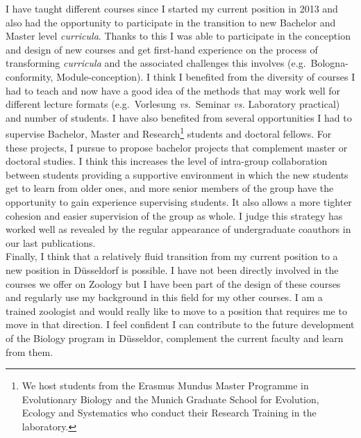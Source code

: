 \documentclass[a4paper,11pt]{article}
\begin{document}
I have taught different courses since I started my current position in 2013 and also had the opportunity to participate in the transition to new Bachelor and Master level \emph{curricula}. Thanks to this I was able to participate in the conception and design of new courses and get first-hand experience on the process of transforming \emph{curricula} and the associated challenges this involves (e.g.~Bologna-conformity, Module-conception). I think I benefited from the diversity of courses I had to teach and now have a good idea of the methods that may work well for different lecture formats (e.g.~Vorlesung \emph{vs.}~Seminar \emph{vs.} Laboratory practical) and number of students. I have also benefited from several opportunities I had to supervise Bachelor, Master and Research\footnote{We host students from the Erasmus Mundus Master Programme in Evolutionary Biology and the Munich Graduate School for Evolution, Ecology and Systematics who conduct their Research Training in the laboratory.} students and doctoral fellows. For these projects, I pursue to propose bachelor projects that complement master or doctoral studies. I think this increases the level of intra-group collaboration between students providing a supportive environment in which the new students get to learn from older ones, and more senior members of the group have the opportunity to gain experience supervising students. It also allows a more tighter cohesion and easier supervision of the group as whole. I judge this strategy has worked well as revealed by the regular appearance of undergraduate coauthors in our last publications.\\

Finally, I think that a relatively fluid transition from my current position to a new position in D\"usseldorf is possible. I have not been directly involved in the courses we offer on Zoology but I have been part of the design of these courses and regularly use my background in this field for my other courses. I am a trained zoologist and would really like to move to a position that requires me to move in that direction. I feel confident I can contribute to the future development of the Biology program in D\"usseldor, complement the current faculty and learn from them.




\end{document}
